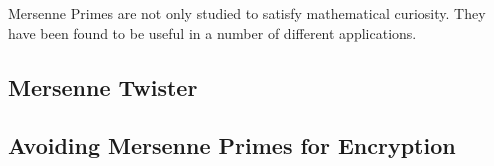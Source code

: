 Mersenne Primes are not only studied to satisfy mathematical curiosity.  They have been found to be useful in a number of different applications.  

\subsection{Mersenne Twister}

\subsection{Avoiding Mersenne Primes for Encryption}


